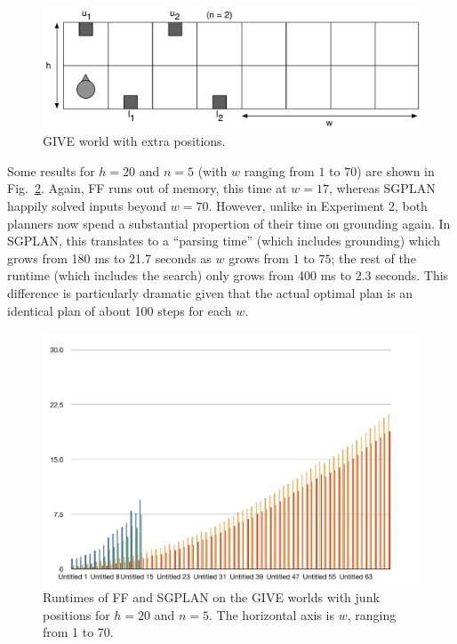 \begin{figure}
  \centering
  \includegraphics[width=1\columnwidth]{pic-empty-buttons}
  \caption{GIVE world with extra positions.}
  \label{fig:give-junk}
\end{figure}

Some results for $h=20$ and $n=5$ (with $w$ ranging from $1$ to $70$)
are shown in Fig.~\ref{fig:give-runtime-junk}.  Again, FF runs out of
memory, this time at $w=17$, whereas SGPLAN happily solved inputs
beyond $w=70$.  However, unlike in Experiment 2, both planners now
spend a substantial propertion of their time on grounding again.  In
SGPLAN, this translates to a ``parsing time'' (which
 includes grounding) which grows from 180 ms to 21.7
seconds as $w$ grows from $1$ to $75$; the rest of the runtime (which
includes the search) only grows from 400 ms to 2.3 seconds.  This
difference is particularly dramatic given that the actual optimal plan
is an identical plan of about 100 steps for each $w$.

\begin{figure}
  \centering
  \includegraphics[width=1\columnwidth]{pic-runtime-empty-world}
  \caption{Runtimes of FF and SGPLAN on the GIVE worlds with junk
    positions for $h=20$ and $n=5$. The horizontal axis is $w$,
    ranging from 1 to 70.}
  \label{fig:give-runtime-junk}
\end{figure}


